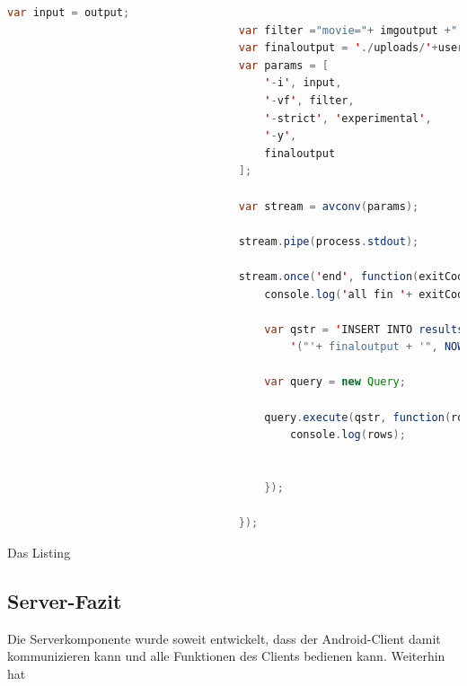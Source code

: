 \begin{lstlisting}[label=node-videoResult,language=Java, caption=Gesamtvideo kombinieren]
 var input = output;
                                    var filter ="movie="+ imgoutput +" [wm];[in][wm] overlay=720:0 [out]";
                                    var finaloutput = './uploads/'+user+'/'+session+'/results/result.mpg';
                                    var params = [
                                        '-i', input,
                                        '-vf', filter,
                                        '-strict', 'experimental',
                                        '-y',
                                        finaloutput
                                    ];

                                    var stream = avconv(params);

                                    stream.pipe(process.stdout);

                                    stream.once('end', function(exitCode, signal) {
                                        console.log('all fin '+ exitCode );

                                        var qstr = 'INSERT INTO results (file, timestamp, sessions_idsessions) VALUES ' +
                                            '("'+ finaloutput + '", NOW(),' + session + ')';

                                        var query = new Query;

                                        query.execute(qstr, function(rows) {
                                            console.log(rows);


                                        });

                                    });
\end{lstlisting}



Das Listing 


\subsection{Server-Fazit}


Die Serverkomponente wurde soweit entwickelt, dass der Android-Client damit kommunizieren kann und alle Funktionen des Clients bedienen kann. Weiterhin hat 
